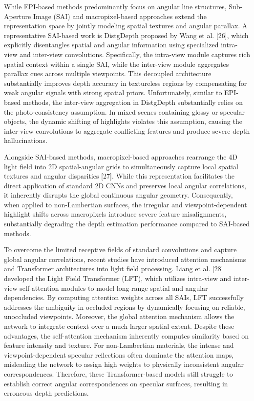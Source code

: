 While EPI-based methods predominantly focus on angular line structures, Sub-Aperture Image (SAI) and macropixel-based approaches extend the representation space by jointly modeling spatial textures and angular parallax. A representative SAI-based work is DistgDepth proposed by Wang et al. [26], which explicitly disentangles spatial and angular information using specialized intra-view and inter-view convolutions. Specifically, the intra-view module captures rich spatial context within a single SAI, while the inter-view module aggregates parallax cues across multiple viewpoints. This decoupled architecture substantially improves depth accuracy in textureless regions by compensating for weak angular signals with strong spatial priors. Unfortunately, similar to EPI-based methods, the inter-view aggregation in DistgDepth substantially relies on the photo-consistency assumption. In mixed scenes containing glossy or specular objects, the dynamic shifting of highlights violates this assumption, causing the inter-view convolutions to aggregate conflicting features and produce severe depth hallucinations.

Alongside SAI-based methods, macropixel-based approaches rearrange the 4D light field into 2D spatial-angular grids to simultaneously capture local spatial textures and angular disparities [27]. While this representation facilitates the direct application of standard 2D CNNs and preserves local angular correlations, it inherently disrupts the global continuous angular geometry. Consequently, when applied to non-Lambertian surfaces, the irregular and viewpoint-dependent highlight shifts across macropixels introduce severe feature misalignments, substantially degrading the depth estimation performance compared to SAI-based methods.

To overcome the limited receptive fields of standard convolutions and capture global angular correlations, recent studies have introduced attention mechanisms and Transformer architectures into light field processing. Liang et al. [28] developed the Light Field Transformer (LFT), which utilizes intra-view and inter-view self-attention modules to model long-range spatial and angular dependencies. By computing attention weights across all SAIs, LFT successfully addresses the ambiguity in occluded regions by dynamically focusing on reliable, unoccluded viewpoints. Moreover, the global attention mechanism allows the network to integrate context over a much larger spatial extent. Despite these advantages, the self-attention mechanism inherently computes similarity based on feature intensity and texture. For non-Lambertian materials, the intense and viewpoint-dependent specular reflections often dominate the attention maps, misleading the network to assign high weights to physically inconsistent angular correspondences. Therefore, these Transformer-based models still struggle to establish correct angular correspondences on specular surfaces, resulting in erroneous depth predictions.

